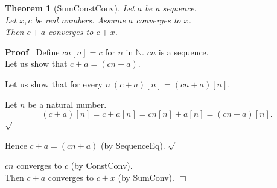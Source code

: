 \documentclass{article}
\newenvironment{forthel}{\begin{leftbar}}{\end{leftbar}}
\newenvironment{proof}{\noindent\textbf{Proof\ }}{\hspace*{\fill}$\Box$\medskip}
\newenvironment{subproof}{\begin{list}{}{}
		\item[\text{Proof}]}{\hfill $\surd$ \end{list}}
\newtheorem{theorem}{Theorem}
\newcommand{\NN}{\mathbb{N}}
\newcommand{\plusone}{+}
\newcommand{\plustwo}{+}
\newcommand{\dotequal}{=}
\begin{document}
\begin{forthel}
	\begin{theorem}[SumConstConv]
	Let $a$ be a sequence. \\Let $x,c$ be real numbers. Assume $a$ converges to $x$.
	\\Then $c \plustwo a$ converges to $c + x$.
	\end{theorem}
	\begin{proof}
	Define $cn[n] = c$ for $n$ in $\NN$.
	$cn$ is a sequence.
	\\Let us show that $c \plustwo a = (cn \plusone a)$.
	\begin{subproof}
	Let us show that for every $n \ (c \plustwo a)[n] = (cn \plusone a)[n]$.
	\begin{subproof}
	Let $n$ be a natural number.
	$$(c \plustwo a)[n] \dotequal c + a[n]
	\dotequal cn[n] + a[n]
	\dotequal (cn \plusone a)[n].$$
	\end{subproof}
	Hence $c \plustwo a = (cn \plusone a)$ (by SequenceEq).
	\end{subproof}
	$cn$ converges to $c$ (by ConstConv).
	\\Then $c \plustwo a$ converges to $c + x$ (by SumConv).
	\end{proof}
	

\end{forthel}
\end{document}
